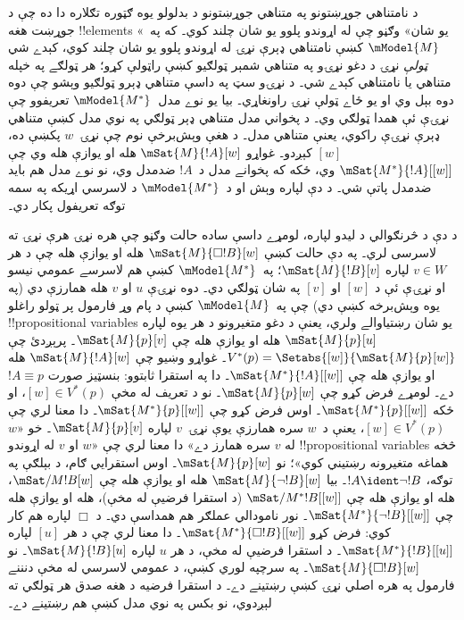 \documentclass[../../../include/open-logic-section]{subfiles}
\begin{document}
د نامتناهي جوړښتونو په متناهي جوړښتونو د بدلولو يوه ګټوره تګلاره دا ده چې
د جوړښت هغه !!{element}s «يو شان» وګڼو چې له اړوندو پلوو يو شان چلند کوي۔
که په~$\mModel{M}$ کښې نامتناهي ډېرې نړۍ له اړوندو پلوو يو شان چلند کوي،
کېدے شي \emph{ټولې} نړۍ د دغو نړۍو په متناهي شمېر ټولګيو کښې راټولې کړو؛
هر ټولګے په خپله متناهي يا نامتناهي کېدے شي۔ د نړۍو سټ په داسې
متناهي ډېرو ټولګيو وېشو چې دوه دوه بېل وي او يو ځاے ټولې نړۍ راونغاړي۔ بيا يو نوے مدل~$\mModel{M^*}$ تعريفوو چې نړۍې
ئې همدا ټولګي وي۔ د پخواني مدل متناهي ډېر ټولګي په نوي مدل کښې متناهي ډېرې
نړۍې راکوي، يعنې متناهي مدل۔ د هغې وېش‌برخې نوم چې نړۍ~$w$ پکښې ده، $[w]$
کېږدو۔ غواړو $\mSat{M}{!A}[w]$ هله او يوازې هله وي چې
$\mSat{M^*}{!A}[{[w]}]$ وي، ځکه که پخوانے مدل د~$!A$ ضدمدل وي، نو
نوے مدل هم بايد ضدمدل پاتې شي۔ د دې لپاره وېش او د~$\mModel{M^*}$
د لاسرسي اړيکه په سمه توګه تعريفول پکار دي۔

د دې د څرنګوالي د ليدو لپاره، لومړے داسې ساده حالت وګڼو چې هره نړۍ هرې
نړۍ ته لاسرسی لري۔ په دې حالت کښې $\mSat{M}{\Box !B}[w]$ هله او يوازې
هله چې د هر $v \in W$ لپاره $\mSat{M}{!B}[v]$؛ په~$\mModel{M^*}$
کښې هم لاسرسے عمومي نيسو او نړۍې ئې د $[w]$ او $[v]$ په شان ټولګي
دي۔ دوه نړۍې $u$ او $v$ هله همارزې دي (په يوه وېش‌برخه کښې دي) چې
په~$\mModel{M}$ کښې د پام وړ فارمول پر ټولو راغلو !!{propositional variable}s
يو شان رښتياوالے ولري، يعنې د دغو متغيرونو د هر يوه لپاره
$\mSat{M}{p}[u]$ هله او يوازې هله چې $\mSat{M}{p}[v]$۔ پرېږدئ چې $V^*(p) = \Setabs{[w]}{\mSat{M}{p}[w]}$۔
غواړو وښيو چې $\mSat{M}{!A}[w]$ هله او يوازې هله چې
$\mSat{M^*}{!A}[{[w]}]$۔ دا په استقرا ثابتوو: بنسټيز صورت $!A
\equiv p$ دے۔ لومړے فرض کړو چې $\mSat{M}{p}[w]$۔ نو د تعريف له مخې
$[w] \in V^*(p)$، او ځکه $\mSat{M^*}{p}[{[w]}]$۔ اوس فرض کړو چې
$\mSat{M^*}{p}[{[w]}]$۔ دا معنا لري چې $[w] \in V^*(p)$، يعنې د~$w$
سره همارزې يوې نړۍ~$v$ لپاره $\mSat{M}{p}[v]$۔ خو «$w$ له $v$
سره همارز دے» دا معنا لري چې «$w$ او $v$ له اړوندو !!{propositional variable}s
څخه هماغه متغيرونه رښتيني کوي»؛ نو $\mSat{M}{p}[w]$۔ اوس استقرايي ګام، د بېلګې په توګه،
$!A \ident \lnot !B$۔ بيا $\mSat{M}{\lnot !B}[w]$ هله او يوازې هله چې
$\mSat/{M}{!B}[w]$، هله او يوازې هله چې $\mSat/{M^*}{!B}[{[w]}]$
(د استقرا فرضيې له مخې)، هله او يوازې هله چې
$\mSat{M^*}{\lnot !B}[{[w]}]$۔ نور نامودالي عملګر هم همداسې دي۔ د
$\Box$ لپاره هم کار کوي: فرض کړو $\mSat{M^*}{\Box
  !B}[{[w]}]$۔ دا معنا لري چې د هر $[u]$ لپاره
$\mSat{M^*}{!B}[{[u]}]$۔ د استقرا فرضيې له مخې، د هر $u$ لپاره
$\mSat{M}{!B}[u]$۔ نو $\mSat{M}{\Box !B}[w]$۔ په سرچپه
لوري کښې، د عمومي لاسرسي له مخې دنننے فارمول په هره اصلي نړۍ کښې
رښتينے دے۔ د استقرا فرضيه د هغه صدق هر ټولګي ته لېږدوي، نو بکس په
نوي مدل کښې هم رښتينے دے۔
\end{document}
